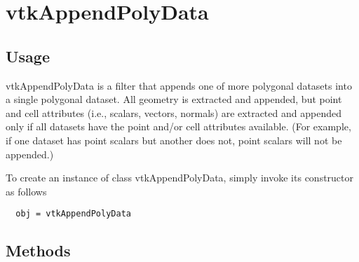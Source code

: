 \section{vtkAppendPolyData}

\subsection{Usage}

 
 vtkAppendPolyData is a filter that appends one of more polygonal datasets
 into a single polygonal dataset. All geometry is extracted and appended,
 but point and cell attributes (i.e., scalars, vectors, normals) are
 extracted and appended only if all datasets have the point and/or cell
 attributes available.  (For example, if one dataset has point scalars but
 another does not, point scalars will not be appended.)

To create an instance of class vtkAppendPolyData, simply
invoke its constructor as follows
\begin{verbatim}
  obj = vtkAppendPolyData
\end{verbatim}
\subsection{Methods}

